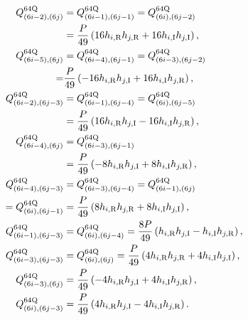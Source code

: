 {\begin{align}
	Q_{(6i-2),(6j)}^{64{\rm Q}} &= Q_{(6i-1),(6j-1)}^{64{\rm Q}} = Q_{(6i),(6j-2)}^{64{\rm Q}} \nonumber\\
	&= \frac{P}{49} \left(16 h_{i,{\rm R}} h_{j,{\rm R}} + 16 h_{i,{\rm I}} h_{j,{\rm I}} \right), \\
	Q_{(6i-5),(6j)}^{64{\rm Q}} &= Q_{(6i-4),(6j-1)}^{64{\rm Q}} = Q_{(6i-3),(6j-2)}^{64{\rm Q}} \nonumber\\
	=& \frac{P}{49} \left( -16 h_{i,{\rm R}} h_{j,{\rm I}} + 16 h_{i,{\rm I}} h_{j,{\rm R}} \right), \\
	Q_{(6i-2),(6j-3)}^{64{\rm Q}} &= Q_{(6i-1),(6j-4)}^{64{\rm Q}} = Q_{(6i),(6j-5)}^{64{\rm Q}} \nonumber\\
	&= \frac{P}{49} \left( 16 h_{i,{\rm R}} h_{j,{\rm I}} - 16 h_{i,{\rm I}} h_{j,{\rm R}} \right), \\
	Q_{(6i-4),(6j)}^{64{\rm Q}} &= Q_{(6i-3),(6j-1)}^{64{\rm Q}} \nonumber\\
	&= \frac{P}{49} \left( -8 h_{i,{\rm R}} h_{j,{\rm I}} + 8 h_{i,{\rm I}} h_{j,{\rm R}} \right), \\
	Q_{(6i-4),(6j-3)}^{64{\rm Q}} &= Q_{(6i-3),(6j-4)}^{64{\rm Q}} = 
	Q_{(6i-1),(6j)}^{64{\rm Q}} 
	\nonumber\\
	= Q_{(6i),(6j-1)}^{64{\rm Q}} &= \frac{P}{49} \left( 8 h_{i,{\rm R}} h_{j,{\rm R}} + 8 h_{i,{\rm I}} h_{j,{\rm I}} \right), \\
	Q_{(6i-1),(6j-3)}^{64{\rm Q}} &= Q_{(6i),(6j-4)}^{64{\rm Q}} = \frac{8 P}{49} \left( h_{i,{\rm R}} h_{j,{\rm I}} - h_{i,{\rm I}} h_{j,{\rm R}} \right), \\
	Q_{(6i-3),(6j-3)}^{64{\rm Q}} &= Q_{(6i),(6j)}^{64{\rm Q}} = \frac{P}{49} \left( 4 h_{i,{\rm R}} h_{j,{\rm R}} + 4 h_{i,{\rm I}} h_{j,{\rm I}} \right), \\
	Q_{(6i-3),(6j)}^{64{\rm Q}} &= \frac{P}{49} \left( -4 h_{i,{\rm R}} h_{j,{\rm I}} + 4 h_{i,{\rm I}} h_{j,{\rm R}} \right), \\
	Q_{(6i),(6j-3)}^{64{\rm Q}} &= \frac{P}{49} \left( 4 h_{i,{\rm R}} h_{j,{\rm I}} - 4 h_{i,{\rm I}} h_{j,{\rm R}} \right).
\end{align}
}